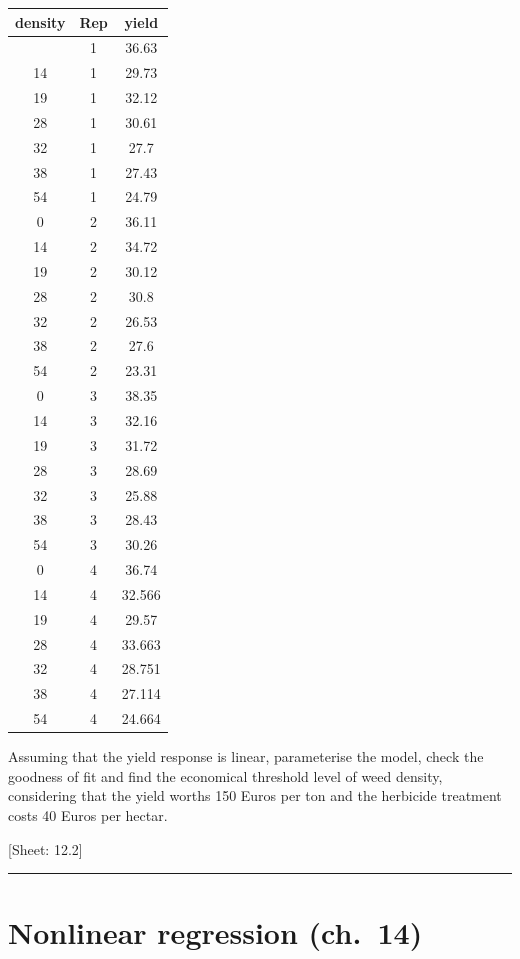 \documentclass[a4paper,12pt,oneside]{book}
\begin{document}
\begin{longtable}[]{@{}ccc@{}}
\toprule\noalign{}
density & Rep & yield \\
\midrule\noalign{}
\endhead
\bottomrule\noalign{}
\endlastfoot
0 & 1 & 36.63 \\
14 & 1 & 29.73 \\
19 & 1 & 32.12 \\
28 & 1 & 30.61 \\
32 & 1 & 27.7 \\
38 & 1 & 27.43 \\
54 & 1 & 24.79 \\
0 & 2 & 36.11 \\
14 & 2 & 34.72 \\
19 & 2 & 30.12 \\
28 & 2 & 30.8 \\
32 & 2 & 26.53 \\
38 & 2 & 27.6 \\
54 & 2 & 23.31 \\
0 & 3 & 38.35 \\
14 & 3 & 32.16 \\
19 & 3 & 31.72 \\
28 & 3 & 28.69 \\
32 & 3 & 25.88 \\
38 & 3 & 28.43 \\
54 & 3 & 30.26 \\
0 & 4 & 36.74 \\
14 & 4 & 32.566 \\
19 & 4 & 29.57 \\
28 & 4 & 33.663 \\
32 & 4 & 28.751 \\
38 & 4 & 27.114 \\
54 & 4 & 24.664 \\
\end{longtable}

Assuming that the yield response is linear, parameterise the model, check the goodness of fit and find the economical threshold level of weed density, considering that the yield worths 150 Euros per ton and the herbicide treatment costs 40 Euros per hectar.

{[}Sheet: 12.2{]}

\begin{center}\rule{0.5\linewidth}{0.5pt}\end{center}

\hypertarget{nonlinear-regression-ch.-14}{%
\section{Nonlinear regression (ch.~14)}\label{nonlinear-regression-ch.-14}}
\end{document}
